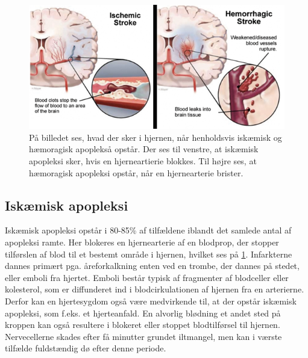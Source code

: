 \begin{figure}[H]
	\centering
	\includegraphics[scale=0.8]{figures/bProblemanalyse/haemoragisk_og_iskaemisk.png}
	\caption{På billedet ses, hvad der sker i hjernen, når henholdsvis iskæmisk og hæmoragisk apoplekså opstår. Der ses til venstre, at iskæmisk apopleksi sker, hvis en hjerneartierie blokkes. Til højre ses, at hæmoragisk apopleksi opstår, når en hjernearterie brister.\cite{Ritter2015}}
	\label{haem-isk}
\end{figure}

\subsection{Iskæmisk apopleksi}
Iskæmisk apopleksi opstår i 80-85\% af tilfældene iblandt det samlede antal af apopleksi ramte\cite{Sundhed.dk2014}. Her blokeres en hjernearterie af en blodprop, der stopper tilførslen af blod til et bestemt område i hjernen, hvilket ses på \ref{haem-isk}. Infarkterne dannes primært pga. åreforkalkning enten ved en trombe, der dannes på stedet, eller emboli fra hjertet.\cite{Schulze2011} Emboli består typisk af fragmenter af blodceller eller kolesterol, som er diffunderet ind i blodcirkulationen af hjernen fra en arterierne\cite{Academic2015a}. Derfor kan en hjertesygdom også være medvirkende til, at der opstår iskæmisk apopleksi, som f.eks. et hjerteanfald. En alvorlig blødning et andet sted på kroppen kan også resultere i blokeret eller stoppet blodtilførsel til hjernen.\cite{Hjernesagen2015a} Nervecellerne skades efter få minutter grundet iltmangel, men kan i værste tilfælde fuldstændig dø efter denne periode\cite{Schulze2011}\cite{Giraldo2015}.%

